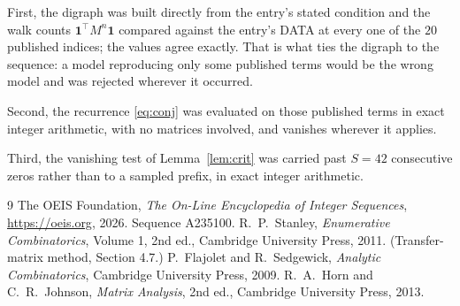 \documentclass[11pt,a4paper]{article}
\theoremstyle{plain}
\theoremstyle{definition}
\begin{document}
First, the digraph was built directly from the entry's stated condition and the walk counts
$\mathbf{1}^{\!\top}M^{n}\mathbf{1}$ compared against the entry's DATA at every one of
the $20$ published indices; the values agree exactly. That is what ties the digraph to
the sequence: a model reproducing only some published terms would be the wrong model and
was rejected wherever it occurred.

Second, the recurrence \eqref{eq:conj} was evaluated on those published terms in exact
integer arithmetic, with no matrices involved, and vanishes wherever it applies.

Third, the vanishing test of Lemma~\ref{lem:crit} was carried past $S=42$ consecutive
zeros rather than to a sampled prefix, in exact integer arithmetic.

\begin{thebibliography}{9}
 The OEIS Foundation, \emph{The On-Line Encyclopedia of Integer
Sequences}, \url{https://oeis.org}, 2026. Sequence A235100.
 R.~P.~Stanley, \emph{Enumerative Combinatorics}, Volume 1, 2nd ed.,
Cambridge University Press, 2011. (Transfer-matrix method, Section 4.7.)
 P.~Flajolet and R.~Sedgewick, \emph{Analytic Combinatorics}, Cambridge
University Press, 2009.
 R.~A.~Horn and C.~R.~Johnson, \emph{Matrix Analysis}, 2nd ed., Cambridge
University Press, 2013.
\end{thebibliography}
\end{document}
